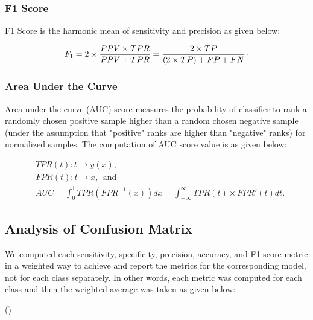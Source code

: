 \subsubsection*{F1 Score}

F1 Score is the harmonic mean of sensitivity and precision as given below:

\begin{equation}
\label{eq:F1_Score}
    F_{1} = 2 \times \frac{PPV \times TPR}{PPV + TPR} = \frac{2 \times TP}{(2 \times TP) + FP + FN}\raisepunct{.}
\end{equation}

 
\subsubsection*{Area Under the Curve}

Area under the curve (AUC) score measures the probability of classifier to rank a randomly chosen positive sample higher than a random chosen negative sample (under the assumption that "positive" ranks are higher than "negative" ranks) for normalized samples. The computation of AUC score value is as given below:

\begin{align}
\label{eq:AUC_Score}
    \nonumber
    & TPR(t) : t \rightarrow y \left ( x \right ), \\
    \nonumber
    & FPR(t) : t \rightarrow x, \:\: \text{and} \\ 
    & AUC = \int_{0}^{1} TPR \left ( FPR^{-1}\left ( x \right ) \right ) dx = \int_{-\infty}^{\infty} TPR \left ( t \right ) \times {FPR}' \left ( t \right ) dt.
\end{align}


\subsection{Analysis of Confusion Matrix}

We computed each sensitivity, specificity, precision, accuracy, and F1-score metric in a weighted way to achieve and report the metrics for the corresponding model, not for each class separately. In other words, each metric was computed for each class and then the weighted average was taken as given below:

\be
\label{eq:weighted_avg_metric}
 {()} \:\: 
\ee


